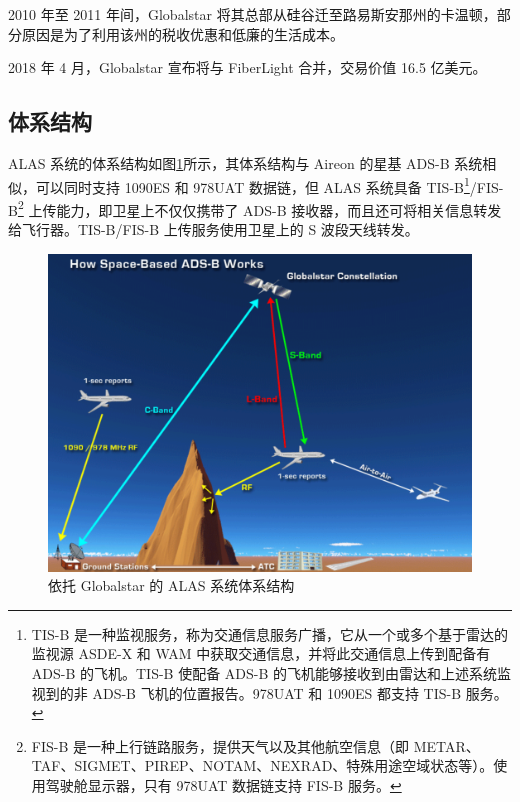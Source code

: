 
2010 年至 2011 年间，Globalstar 将其总部从硅谷迁至路易斯安那州的卡温顿，部分原因是为了利用该州的税收优惠和低廉的生活成本。

2018 年 4 月，Globalstar 宣布将与 FiberLight 合并，交易价值 16.5 亿美元。

\subsection{体系结构}

ALAS 系统的体系结构如图\ref{fig:31-Globalstar-4}所示，其体系结构与 Aireon 的星基 ADS-B 系统相似，可以同时支持 1090ES 和 978UAT 数据链，但 ALAS 系统具备 TIS-B\footnote{TIS-B 是一种监视服务，称为交通信息服务广播，它从一个或多个基于雷达的监视源 ASDE-X 和 WAM 中获取交通信息，并将此交通信息上传到配备有 ADS-B 的飞机。TIS-B 使配备 ADS-B 的飞机能够接收到由雷达和上述系统监视到的非 ADS-B 飞机的位置报告。978UAT 和 1090ES 都支持 TIS-B 服务。}/FIS-B\footnote{FIS-B 是一种上行链路服务，提供天气以及其他航空信息（即 METAR、TAF、SIGMET、PIREP、NOTAM、NEXRAD、特殊用途空域状态等）。使用驾驶舱显示器，只有 978UAT 数据链支持 FIS-B 服务。} 上传能力，即卫星上不仅仅携带了 ADS-B 接收器，而且还可将相关信息转发给飞行器。TIS-B/FIS-B 上传服务使用卫星上的 S 波段天线转发。

\begin{figure}[!htb]
\centering
\includegraphics[width=14cm]{pic/31-Globalstar-4.pdf}
\caption{依托 Globalstar 的 ALAS 系统体系结构\protect\footnotemark}
\label{fig:31-Globalstar-4}
\end{figure}

